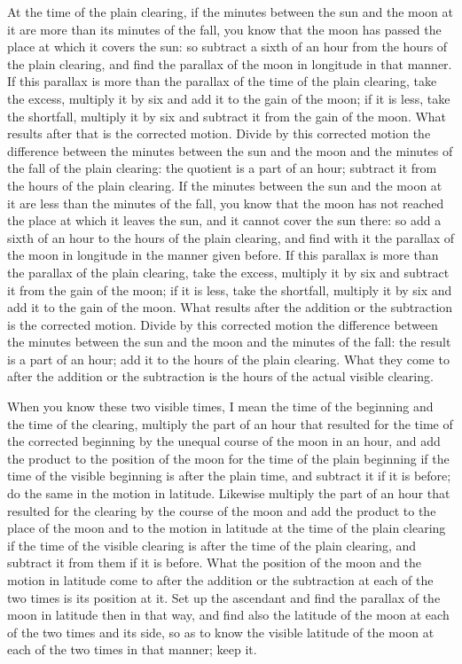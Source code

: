\documentclass[11pt]{article}
\newcommand{\ArPage}[1]{\marginpar{\footnotesize\color{gray}Ar.\,p.\,#1}}
\begin{document}
\par \ArPage{164}At the time of the plain clearing, if the minutes between the sun and the moon at it are more than its minutes of the fall, you know that the moon has passed the place at which it covers the sun: so subtract a sixth of an hour from the hours of the plain clearing, and find the parallax of the moon in longitude in that manner. If this parallax is more than the parallax of the time of the plain clearing, take the excess, multiply it by six and add it to the gain of the moon; if it is less, take the shortfall, multiply it by six and subtract it from the gain of the moon. What results after that is the corrected motion. Divide by this corrected motion the difference between the minutes between the sun and the moon and the minutes of the fall of the plain clearing: the quotient is a part of an hour; subtract it from the hours of the plain clearing. If the minutes between the sun and the moon at it are less than the minutes of the fall, you know that the moon has not reached the place at which it leaves the sun, and it cannot cover the sun there: so add a sixth of an hour to the hours of the plain clearing, and find with it the parallax of the moon in longitude in the manner given before. If this parallax is more than the parallax of the plain clearing, take the excess, multiply it by six and subtract it from the gain of the moon; if it is less, take the shortfall, multiply it by six and add it to the gain of the moon. What results after the addition or the subtraction is the corrected motion. Divide by this corrected motion the difference between the minutes between the sun and the moon and the minutes of the fall: the result is a part of an hour; add it to the hours of the plain clearing. What they come to after the addition or the subtraction is the hours of the actual visible clearing.\par
\par When you know these two visible times, I mean the time of the beginning and the time of the clearing, multiply the part of an hour that resulted for the time of the corrected beginning by the unequal course of the moon in an hour, and add the product to the position of the moon for the time of the plain beginning if the time of the visible beginning is after the plain time, and subtract it if it is before; do the same in the motion in latitude. Likewise multiply the part of an hour that resulted for the clearing by the course of the moon and add the product to the place of the moon and to the motion in latitude at the time of the plain clearing if the time of the visible clearing is after the time of the plain clearing, and subtract it from them if it is before. What the position of the moon and the motion in latitude come to after the addition or the subtraction at each of the two times is its position at it. Set up the ascendant and find the parallax of the moon in latitude then in that way, and find also the latitude of the moon at each of the two times and its side, so as to know the visible latitude of the moon at each of the two times in that manner; keep it.\par
\end{document}
